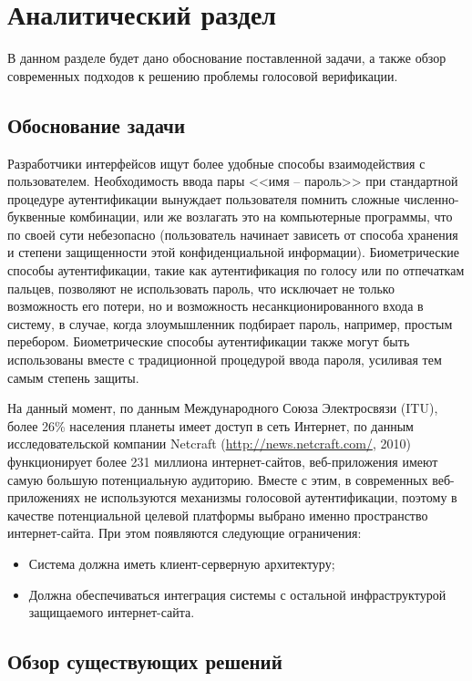\chapter{Аналитический раздел}

В данном разделе будет дано обоснование поставленной задачи, а также обзор современных подходов к решению проблемы голосовой верификации.

\section{Обоснование задачи}

Разработчики интерфейсов ищут более удобные способы взаимодействия с пользователем. Необходимость ввода пары <<имя -- пароль>> при стандартной процедуре аутентификации вынуждает пользователя помнить сложные численно-буквенные комбинации, или же возлагать это на компьютерные программы, что по своей сути небезопасно (пользователь начинает зависеть от способа хранения и степени защищенности этой конфиденциальной информации). Биометрические способы аутентификации, такие как аутентификация по голосу или по отпечаткам пальцев, позволяют не использовать пароль, что исключает не только возможность его потери, но и возможность несанкционированного входа в систему, в случае, когда злоумышленник подбирает пароль, например, простым перебором. Биометрические способы аутентификации также могут быть использованы вместе с традиционной процедурой ввода пароля, усиливая тем самым степень защиты.

На данный момент, по данным Международного Союза Электросвязи (ITU), более 26\% населения планеты имеет доступ в сеть Интернет, по данным исследовательской компании Netcraft (\url{http://news.netcraft.com/}, 2010) функционирует более 231 миллиона интернет-сайтов, веб-приложения имеют самую большую потенциальную аудиторию. Вместе с этим, в современных веб-приложениях не используются механизмы голосовой аутентификации, поэтому в качестве потенциальной целевой платформы выбрано именно пространство интернет-сайта. При этом появляются следующие ограничения:

\begin{itemize}
\item Система должна иметь клиент-серверную архитектуру;
\item Должна обеспечиваться интеграция системы с остальной инфраструктурой защищаемого интернет-сайта.
\end{itemize}

\section{Обзор существующих решений}
\label{sec:overview}

